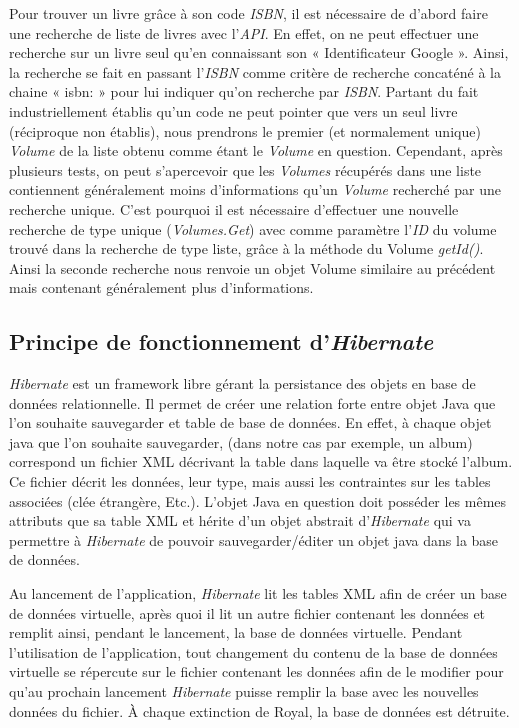 Pour trouver un livre grâce à son code \emph{ISBN}, il est nécessaire de d'abord faire une recherche de liste de livres avec l'\emph{API}. 
En effet, on ne peut effectuer une recherche sur un livre seul qu'en connaissant son « Identificateur Google ». 
Ainsi, la recherche se fait en passant l'\emph{ISBN} comme critère de recherche concaténé à la chaine « isbn: » pour lui indiquer qu'on recherche par \emph{ISBN}. 
Partant du fait industriellement établis qu'un code ne peut pointer que vers un seul livre (réciproque non établis), nous prendrons le premier (et normalement unique) \emph{Volume} de la liste obtenu comme étant le \emph{Volume} en question. 
Cependant, après plusieurs tests, on peut s'apercevoir que les \emph{Volumes} récupérés dans une liste contiennent généralement moins d'informations qu'un \emph{Volume} recherché par une recherche unique. 
C'est pourquoi il est nécessaire d'effectuer une nouvelle recherche de type unique (\emph{Volumes.Get}) avec comme paramètre l'\emph{ID} du volume trouvé dans la recherche de type liste,
	grâce à la méthode du Volume \emph{getId()}.
	Ainsi la seconde recherche nous renvoie un objet Volume similaire au précédent mais contenant généralement plus d'informations.


\subsection{Principe de fonctionnement d'\emph{Hibernate}}

\emph{Hibernate} est un framework libre gérant la persistance des objets en base de données relationnelle.
Il permet de créer une relation forte entre objet Java que l'on souhaite sauvegarder et table de base de données.
En effet, à chaque objet java que l'on souhaite sauvegarder, (dans notre cas par exemple, un album) correspond un fichier XML décrivant la table dans laquelle va être stocké l'album.
Ce fichier décrit les données, leur type, mais aussi les contraintes sur les tables associées (clée étrangère, Etc.).
L'objet Java en question doit posséder les mêmes attributs que sa table XML et hérite d'un objet abstrait d'\emph{Hibernate} qui va permettre à \emph{Hibernate} de pouvoir sauvegarder/éditer un objet java dans la base de données.

Au lancement de l'application, \emph{Hibernate} lit les tables XML afin de créer un base de données virtuelle, 
	après quoi il lit un autre fichier contenant les données et remplit ainsi, pendant le lancement, la base de données virtuelle.
	Pendant l'utilisation de l'application, tout changement du contenu de la base de données virtuelle se répercute sur le fichier contenant les données afin de le modifier pour qu'au prochain lancement \emph{Hibernate} puisse remplir la base avec les nouvelles données du fichier.
	À chaque extinction de Royal, la base de données est détruite.

